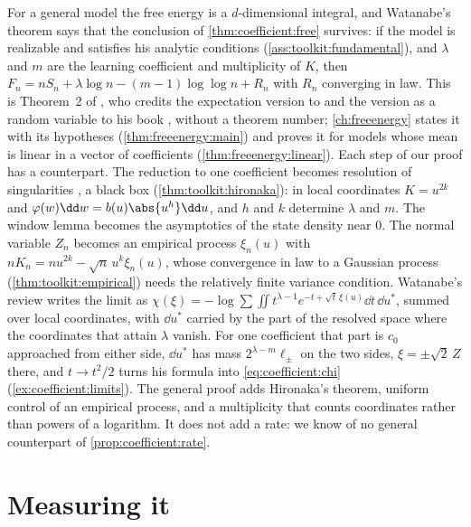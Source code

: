 \begin{refsection}
For a general model the free energy is a $d$-dimensional integral, and Watanabe's theorem says that the conclusion of \cref{thm:coefficient:free} survives: if the model is realizable and satisfies his analytic conditions (\cref{ass:toolkit:fundamental}), and $\lambda$ and $m$ are the learning coefficient and multiplicity of $K$, then $F_n=nS_n+\lambda\log n-(m-1)\log\log n+R_n$ with $R_n$ converging in law. This is Theorem~2 of \textcite{Watanabe2013}, who credits the expectation version to \textcite{Watanabe2001a} and the version as a random variable to his book \parencite{Watanabe2009}, without a theorem number; \cref{ch:freeenergy} states it with its hypotheses (\cref{thm:freeenergy:main}) and proves it for models whose mean is linear in a vector of coefficients (\cref{thm:freeenergy:linear}). Each step of our proof has a counterpart. The reduction to one coefficient becomes resolution of singularities \parencite{Hironaka1964a}, a black box (\cref{thm:toolkit:hironaka}): in local coordinates $K=u^{2k}$ and $\varphi(w)\dd w=b(u)\abs{u^h}\dd u$, and $h$ and $k$ determine $\lambda$ and $m$. The window lemma becomes the asymptotics of the state density near $0$. The normal variable $Z_n$ becomes an empirical process $\xi_n(u)$ with $nK_n=nu^{2k}-\sqrt n\,u^k\xi_n(u)$, whose convergence in law to a Gaussian process (\cref{thm:toolkit:empirical}) needs the relatively finite variance condition. Watanabe's review \parencite{Watanabe2024} writes the limit as $\chi(\xi)=-\log\sum\iint t^{\lambda-1}e^{-t+\sqrt t\,\xi(u)}\dd t\,\dd u^*$, summed over local coordinates, with $\dd u^*$ carried by the part of the resolved space where the coordinates that attain $\lambda$ vanish. For one coefficient that part is $c_0$ approached from either side, $\dd u^*$ has mass $2^{\lambda-m}\ell_\pm$ on the two sides, $\xi=\pm\sqrt2\,Z$ there, and $t\to t^2/2$ turns his formula into \eqref{eq:coefficient:chi} (\cref{ex:coefficient:limits}). The general proof adds Hironaka's theorem, uniform control of an empirical process, and a multiplicity that counts coordinates rather than powers of a logarithm. It does not add a rate: we know of no general counterpart of \cref{prop:coefficient:rate}.

\section{Measuring it}\label{sec:coefficient:measuring}


\end{refsection}
